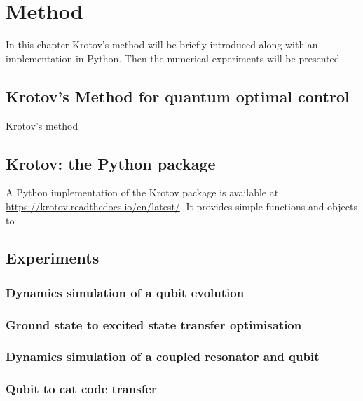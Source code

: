 \documentclass[main.tex]{subfiles}
\begin{document}
\chapter{Method}
In this chapter Krotov's method will be briefly introduced along with an implementation in Python. Then the numerical experiments will be presented.

\section{Krotov's Method for quantum optimal control}
Krotov's method 

\section{Krotov: the Python package}
A Python implementation of the Krotov package is available at \url{https://krotov.readthedocs.io/en/latest/}. It provides simple functions and objects to


\section{Experiments}
\subsection{Dynamics simulation of a qubit evolution}

\subsection{Ground state to excited state transfer optimisation}
\subsection{Dynamics simulation of a coupled resonator and qubit}
\subsection{Qubit to cat code transfer}
\end{document}
